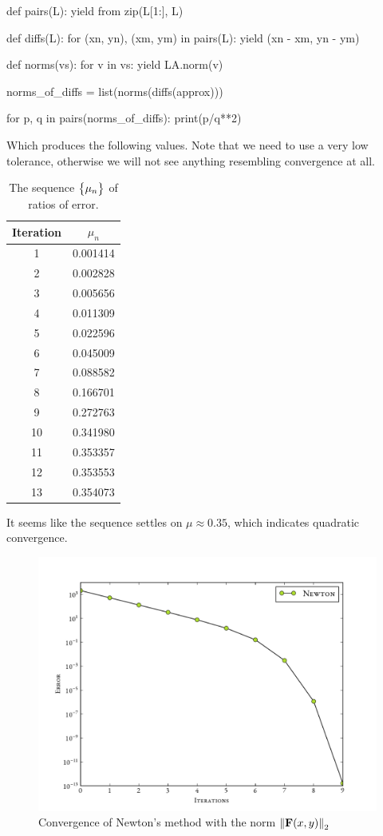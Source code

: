 \documentclass[12pt]{article}
\begin{document}
\begin{multicols*}{2}
\begin{python}[
        caption={Computing the sequence of ratios}
    ]
def pairs(L):
    yield from zip(L[1:], L)

def diffs(L):
    for (xn, yn), (xm, ym) in pairs(L):
        yield (xn - xm, yn - ym)

def norms(vs):
        for v in vs: yield LA.norm(v)

norms_of_diffs = list(norms(diffs(approx)))

for p, q in pairs(norms_of_diffs):
    print(p/q**2)
    \end{python}
Which produces the following values.
Note that we need to use a very low tolerance,
otherwise we will not see anything resembling convergence at all.
    \begin{table}[H]
        \centering
        \caption{The sequence $\Seq{\mu_n}$ of ratios of error.}
        \begin{tabular}{c S[table-format=1.6]}
            \hline\hline
            \bfseries Iteration & $\mu_n$ \\
              & 0.001414\\
            2  & 0.002828\\
            3  & 0.005656\\
            4  & 0.011309\\
            5  & 0.022596\\
            6  & 0.045009\\
            7  & 0.088582\\
            8  & 0.166701\\
            9  & 0.272763\\
            10 & 0.341980\\
            11 & 0.353357\\
            12 & 0.353553\\
            13 & 0.354073\\
            \hline
        \end{tabular}
    \end{table}\noindent
    It seems like the sequence settles on $\mu \approx 0.35$,
    which indicates quadratic convergence.
    \begin{figure}[H]
        \centering
        \includegraphics[width=0.75\columnwidth]{f_norms}
        \caption{
            Convergence of Newton's method with the norm $\Norm[2]{\vec F(x, y)}$
        }
        \label{fig:f_norms}
    \end{figure}\noindent


\end{multicols*}
\end{document}
